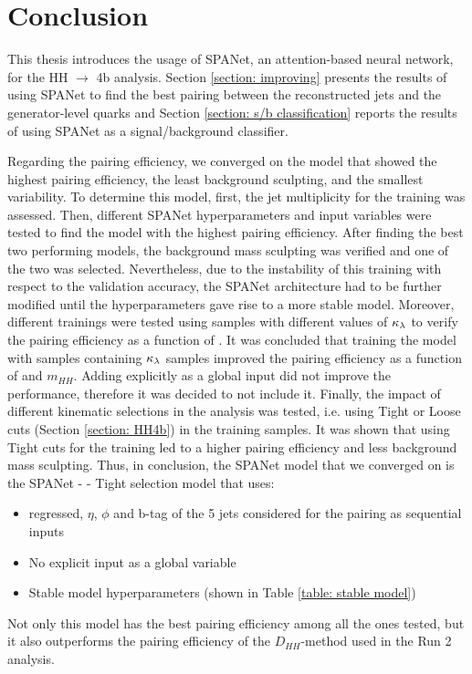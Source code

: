 \section{Conclusion}

This thesis introduces the usage of SPANet, an attention-based neural network, for the HH $\to$ 4b analysis. Section \ref{section: improving} presents the results of using SPANet to find the best pairing between the reconstructed jets and the generator-level quarks and Section \ref{section: s/b classification} reports the results of using SPANet as a signal/background classifier.

\vspace{0.2 cm}

Regarding the pairing efficiency, we converged on the model that showed the highest pairing efficiency, the least background sculpting, and the smallest variability. To determine this model, first, the jet multiplicity for the training was assessed. Then, different SPANet hyperparameters and input variables were tested to find the model with the highest pairing efficiency. After finding the best two performing models, the background mass sculpting was verified and one of the two was selected. Nevertheless, due to the instability of this training with respect to the validation accuracy, the SPANet architecture had to be further modified until the hyperparameters gave rise to a more stable model. Moreover, different trainings were tested using samples with different values of ${\kappa_\lambda}$ to verify the pairing efficiency as a function of \kl. It was concluded that training the model with samples containing ${\kappa_\lambda}$ samples improved the pairing efficiency as a function of \kl and $m_{HH}$. Adding \kl explicitly as a global input did not improve the performance, therefore it was decided to not include it. Finally, the impact of different kinematic selections in the analysis was tested, i.e. using Tight or Loose cuts (Section \ref{section: HH4b}) in the training samples. It was shown that using Tight cuts for the training led to a higher pairing efficiency and less background mass sculpting. Thus, in conclusion, the SPANet model that we converged on is the SPANet - \kl - Tight selection model that uses:
\begin{itemize}
    \item \pt regressed, $\eta$, $\phi$ and b-tag of the 5 jets considered for the pairing as sequential inputs
    \item No explicit \kl input as a global variable
    \item Stable model hyperparameters (shown in Table \ref{table: stable model})
\end{itemize}
\noindent Not only this model has the best pairing efficiency among all the ones tested, but it also outperforms the pairing efficiency of the $D_{HH}$-method used in the Run 2 analysis.

